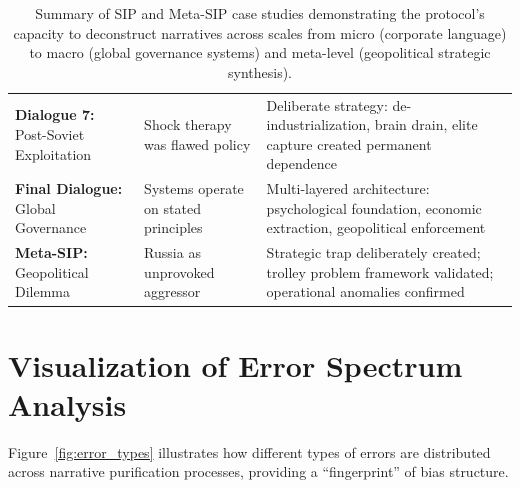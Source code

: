 \documentclass[11pt,a4paper]{article}
\begin{document}
\begin{small}
\begin{table}[ht]
\begin{tabular}{@{}p{3cm}p{4.5cm}p{6cm}@{}}
\addlinespace
\textbf{Dialogue 7:} Post-Soviet Exploitation & Shock therapy was flawed policy & Deliberate strategy: de-industrialization, brain drain, elite capture created permanent dependence \\
\addlinespace
\textbf{Final Dialogue:} Global Governance & Systems operate on stated principles & Multi-layered architecture: psychological foundation, economic extraction, geopolitical enforcement \\
\addlinespace
\textbf{Meta-SIP:} Geopolitical Dilemma & Russia as unprovoked aggressor & Strategic trap deliberately created; trolley problem framework validated; operational anomalies confirmed \\
\bottomrule
\end{tabular}
\caption{Summary of SIP and Meta-SIP case studies demonstrating the protocol's capacity to deconstruct narratives across scales from micro (corporate language) to macro (global governance systems) and meta-level (geopolitical strategic synthesis).}
\label{tab:case_studies}
\end{table}

\section{Visualization of Error Spectrum Analysis}
\label{app:error_spectrum}

Figure~\ref{fig:error_types} illustrates how different types of errors are distributed across narrative purification processes, providing a ``fingerprint'' of bias structure.

\begin{figure}[ht]
\centering
{}
\end{figure}
\end{small}
\end{document}
